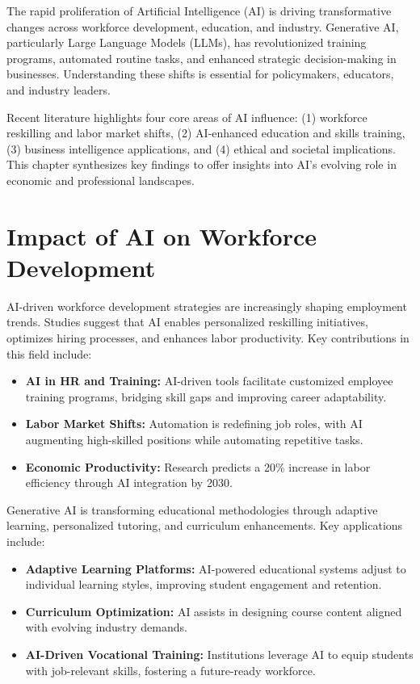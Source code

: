 \documentclass[a4paper,headinclude=on,footinclude=on,12pt,oneside]{scrbook}
\begin{document}

The rapid proliferation of Artificial Intelligence (AI) is driving transformative changes across workforce development, education, and industry. Generative AI, particularly Large Language Models (LLMs), has revolutionized training programs, automated routine tasks, and enhanced strategic decision-making in businesses. Understanding these shifts is essential for policymakers, educators, and industry leaders.

Recent literature highlights four core areas of AI influence: (1) workforce reskilling and labor market shifts, (2) AI-enhanced education and skills training, (3) business intelligence applications, and (4) ethical and societal implications. This chapter synthesizes key findings to offer insights into AI’s evolving role in economic and professional landscapes.

\section{Impact of AI on Workforce Development}

AI-driven workforce development strategies are increasingly shaping employment trends. Studies suggest that AI enables personalized reskilling initiatives, optimizes hiring processes, and enhances labor productivity. Key contributions in this field include:
\begin{itemize}
	\item \textbf{AI in HR and Training:} AI-driven tools facilitate customized employee training programs, bridging skill gaps and improving career adaptability.
	\item \textbf{Labor Market Shifts:} Automation is redefining job roles, with AI augmenting high-skilled positions while automating repetitive tasks.
	\item \textbf{Economic Productivity:} Research predicts a 20\% increase in labor efficiency through AI integration by 2030.
\end{itemize}


Generative AI is transforming educational methodologies through adaptive learning, personalized tutoring, and curriculum enhancements. Key applications include:
\begin{itemize}
	\item \textbf{Adaptive Learning Platforms:} AI-powered educational systems adjust to individual learning styles, improving student engagement and retention.
	\item \textbf{Curriculum Optimization:} AI assists in designing course content aligned with evolving industry demands.
	\item \textbf{AI-Driven Vocational Training:} Institutions leverage AI to equip students with job-relevant skills, fostering a future-ready workforce.
\end{itemize}
\end{document}

